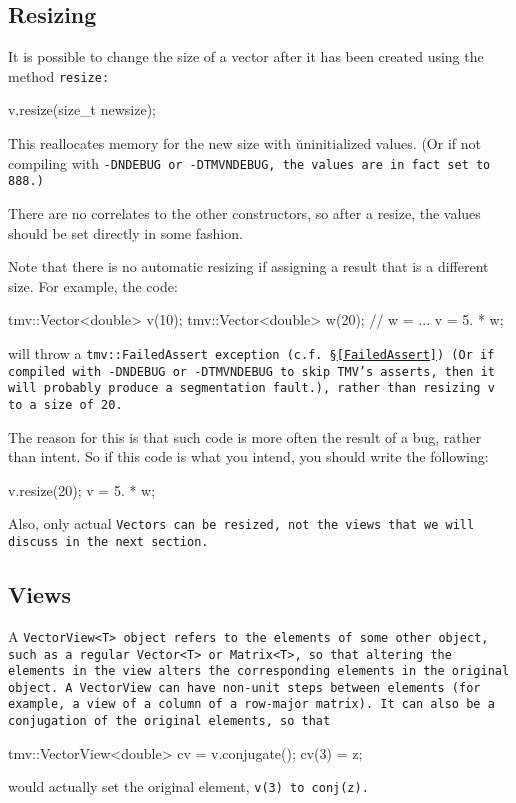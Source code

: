 \subsection{Resizing}
\label{Vector_Resize}

It is possible to change the size of a vector after it has been created using the method \tt{resize}:

\begin{tmvcode}
v.resize(size_t newsize);
\end{tmvcode}

This reallocates memory for the new size with {\u uninitialized} values.  
(Or if not compiling with \tt{-DNDEBUG} or \tt{-DTMVNDEBUG},
the values are in fact set to 888.)

There are no correlates to the other constructors, so after a resize, the 
values should be set directly in some fashion.

Note that there is no automatic resizing if assigning a result that is a different size. 
For example, the code:
\begin{tmvcode}
tmv::Vector<double> v(10);
tmv::Vector<double> w(20);
// w = ...
v = 5. * w;
\end{tmvcode}
will throw a \tt{tmv::FailedAssert} exception (c.f. \S\ref{FailedAssert}) (Or if compiled with 
\tt{-DNDEBUG} or \tt{-DTMVNDEBUG} to skip TMV's asserts, then it will probably produce a segmentation fault.),
rather than resizing \tt{v} to a size of 20.  

The reason for this is that such code is more often the result of a bug, rather than intent.
So if this code is what you intend, you should write the following:
\begin{tmvcode}
v.resize(20);
v = 5. * w;
\end{tmvcode}

Also, only actual \tt{Vector}s can be resized, not the views that we will discuss in the next section.

\subsection{Views}
\label{Vector_Views}

A \tt{VectorView<T>} object refers to the elements of some other object, such as a regular
\tt{Vector<T>} or \tt{Matrix<T>},
so that altering the elements in the view alters the
corresponding elements in the original object.  A \tt{VectorView}
can have non-unit
steps between elements (for example, a view of a column of a row-major
matrix).  It can also be a conjugation of the original
elements, so that
\begin{tmvcode}
tmv::VectorView<double> cv = v.conjugate();
cv(3) = z;
\end{tmvcode}
would actually set the original element, \tt{v(3)} to \tt{conj(z)}. 

